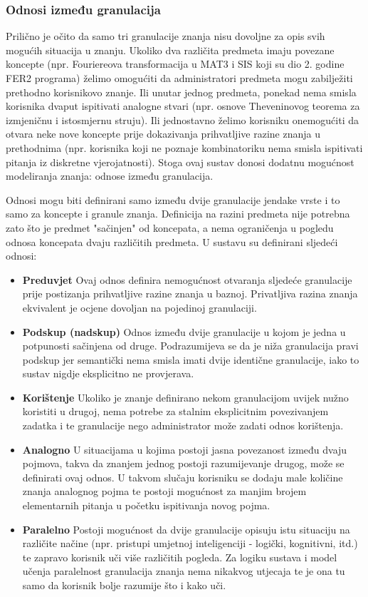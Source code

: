 \documentclass[times, utf8, zavrsni, numeric]{fer}
\begin{document}
\subsubsection{Odnosi između granulacija}
Prilično je očito da samo tri granulacije znanja nisu dovoljne za opis svih mogućih situacija u znanju. Ukoliko dva različita predmeta imaju povezane koncepte (npr. Fouriereova transformacija u MAT3 i SIS koji su dio 2. godine FER2 programa) želimo omogućiti da administratori predmeta mogu zabilježiti prethodno korisnikovo znanje. Ili unutar jednog predmeta, ponekad nema smisla korisnika dvaput ispitivati analogne stvari (npr. osnove Theveninovog teorema za izmjeničnu i istosmjernu struju). Ili jednostavno želimo korisniku onemogućiti da otvara neke nove koncepte prije dokazivanja prihvatljive razine znanja u prethodnima (npr. korisnika koji ne poznaje kombinatoriku nema smisla ispitivati pitanja iz diskretne vjerojatnosti). Stoga ovaj sustav donosi dodatnu mogućnost modeliranja znanja: odnose između granulacija.
\par
Odnosi mogu biti definirani samo između dvije granulacije jendake vrste i to samo za koncepte i granule znanja. Definicija na razini predmeta nije potrebna zato što je predmet "sačinjen" od koncepata, a nema ograničenja u pogledu odnosa koncepata dvaju različitih predmeta. U sustavu su definirani sljedeći odnosi:

\begin{itemize}
	\item \textbf{Preduvjet} Ovaj odnos definira nemogućnost otvaranja sljedeće granulacije prije postizanja prihvatljive razine znanja u baznoj. Privatljiva razina znanja ekvivalent je ocjene dovoljan na pojedinoj granulaciji.
	
	\item \textbf{Podskup (nadskup)} Odnos između dvije granulacije u kojom je jedna u potpunosti sačinjena od druge. Podrazumijeva se da je niža granulacija pravi podskup jer semantički nema smisla imati dvije identične granulacije, iako to sustav nigdje eksplicitno ne provjerava.
	\item \textbf{Korištenje} Ukoliko je znanje definirano nekom granulacijom uvijek nužno koristiti u drugoj, nema potrebe za stalnim eksplicitnim povezivanjem zadatka i te granulacije nego administrator može zadati odnos korištenja.
	\item \textbf{Analogno} U situacijama u kojima postoji jasna povezanost između dvaju pojmova, takva da znanjem jednog postoji razumijevanje drugog, može se definirati ovaj odnos. U takvom slučaju korisniku se dodaju male količine znanja analognog pojma te postoji mogućnost za manjim brojem elementarnih pitanja u početku ispitivanja novog pojma.
	\item \textbf{Paralelno} Postoji mogućnost da dvije granulacije opisuju istu situaciju na različite načine (npr. pristupi umjetnoj inteligenciji - logički, kognitivni, itd.) te zapravo korisnik uči više različitih pogleda. Za logiku sustava i model učenja paralelnost granulacija znanja nema nikakvog utjecaja te je ona tu samo da korisnik bolje razumije što i kako uči. 
\end{itemize}
\end{document}

